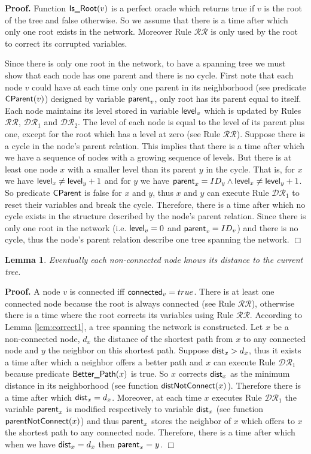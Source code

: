 \documentclass[11pt]{article}
\newtheorem{lemma}{Lemma}
\newenvironment{proof}{\noindent \begin{rm}{\textbf{Proof.} }}{\hspace*{\fill}$\Box$\par\end{rm} \vspace{.3cm}}
\newcommand{\parent}{\mbox{\sf parent}}
\newcommand{\level}{\mbox{\sf level}}
\newcommand{\dist}{\mbox{\sf dist}}
\newcommand{\connect}{\mbox{\sf connected}}
\newcommand{\IsRoot}{\mbox{\sf Is\_Root}}
\newcommand{\CParent}{\mbox{\sf CParent}}
\newcommand{\distNotConnect}{\mbox{\sf distNotConnect}}
\newcommand{\parentNotConnect}{\mbox{\sf parentNotConnect}}
\newcommand{\Better}{\mbox{\sf Better\_Path}}
\newcommand{\ARA}{$\mathcal{DR}_1$}
\newcommand{\ARB}{$\mathcal{DR}_2$}
\newcommand{\CRA}{$\mathcal{RR}$}
\begin{document}
\begin{proof}
Function $\IsRoot(v)$ is a perfect oracle which returns true if $v$
is the root of the tree and false otherwise. So we assume that there
is a time after which only one root exists in the network. Moreover
Rule \CRA\/ is only used by the root to correct its corrupted variables.

Since there is only one root in the network, to have a spanning tree
we must show that each node has one parent and there is no
cycle. First note that each node $v$ could have at each time only one
parent in its neighborhood (see predicate $\CParent(v)$) designed by
variable $\parent_v$, only root has its parent equal to itself. Each
node maintains its level stored in variable $\level_v$ which is updated
by Rules \CRA\/, \ARA\/ and \ARB\/. The level of each node is equal to the level
of its parent plus one, except for the root which has a level at zero
(see Rule \CRA\/). Suppose there is a cycle in the node's parent
relation. This implies that there is a time after which we have a
sequence of nodes with a growing sequence of levels. But there is at
least one node $x$ with a smaller level than its parent $y$ in the
cycle. That is, for $x$ we have $\level_x \neq \level_y +1$ and for $y$
we have $\parent_x=ID_y \wedge \level_x \neq \level_y +1$. So predicate
$\CParent$ is false for $x$ and $y$, thus $x$ and $y$ can execute Rule \ARA\/
to reset their variables and break the cycle. Therefore, there is a
time after which no cycle exists in the structure described by the
node's parent relation. Since there is only one root in the network
(i.e. $\level_v=0$ and $\parent_v=ID_v$) and there is no cycle, thus the
node's parent relation describe one tree spanning the network.
\end{proof}


\begin{lemma}
\label{lem:correct1bis}
Eventually each non-connected node knows its distance to the current tree.
\end{lemma}

\begin{proof}
A node $v$ is connected iff $\connect_v=true$. There is at least one
connected node because the root is always connected (see Rule \CRA\/),
otherwise there is a time where the root corrects its variables using
Rule \CRA\/. According to Lemma \ref{lem:correct1}, a tree spanning the
network is constructed. Let $x$ be a non-connected node, $d_x$ the
distance of the shortest path from $x$ to any connected node and $y$
the neighbor on this shortest path. Suppose $\dist_x>d_x$, thus it
exists a time after which a neighbor offers a better path and $x$ can
execute Rule \ARA\/ because predicate $\Better(x)$ is true. So $x$
corrects $\dist_x$ as the minimum distance in its neighborhood (see
function $\distNotConnect(x)$). Therefore there is a time after which
$\dist_x=d_x$. Moreover, at each time $x$ executes Rule \ARA\/ the variable
$\parent_x$ is modified respectively to variable $\dist_x$ (see function
$\parentNotConnect(x)$) and thus $\parent_x$ stores the neighbor of $x$
which offers to $x$ the shortest path to any connected
node. Therefore, there is a time after which when we have $\dist_x=d_x$
then $\parent_x=y$.
\end{proof}
\end{document}
